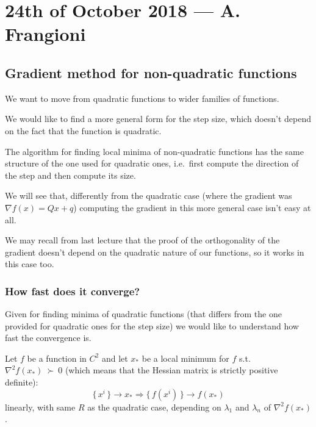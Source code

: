 \documentclass[ComputationalMathematics.tex]{subfiles}
\begin{document}
\section{24th of October 2018 --- A. Frangioni}

\subsection{Gradient method for non-quadratic functions}
We want to move from quadratic functions to wider families of functions.


We would like to find a more general form for the step size, which doesn't depend on the fact that the function is quadratic.

The algorithm for finding local minima of non-quadratic functions has the same structure of the one used for quadratic ones, i.e.~first compute the direction of the step and then compute its size.

We will see that, differently from the quadratic case (where the gradient was $\nabla f(x) = Qx + q$) computing the gradient in this more general case isn't easy at all.

We may recall from last lecture that the proof of the orthogonality of the gradient doesn't depend on the quadratic nature of our functions, so it works in this case too.

\subsubsection{How fast does it converge?}
Given  for finding minima of quadratic functions (that differs from the one provided for quadratic ones for the step size) we would like to understand how fast the convergence is.


\begin{theorem}
  Let $f$ be a function in $C^2$ and let $x_*$ be a local minimum for $f$ s.t.~$\nabla^2 f(x_*)~\succ~0$ (which means that the Hessian matrix is strictly positive definite):
       \[
       \{ \, x^i \, \} \to x_*
        \Longrightarrow \{ \, f(x^i) \, \} \to f(x_*)
      \]
        linearly, with same $R$ as the quadratic case, depending on
       $\lambda_1$ and $\lambda_n$ of $\nabla^2 f(x_*)$.
\end{theorem}
\end{document}
